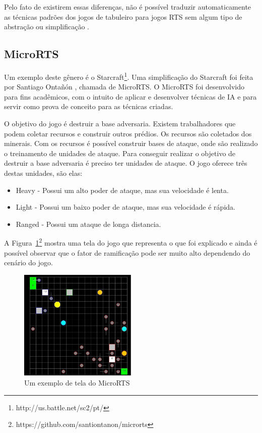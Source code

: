 Pelo fato de existirem essas diferenças, não é possível traduzir automaticamente as técnicas padrões dos jogos de tabuleiro para jogos RTS sem algum tipo de abstração ou simplificação \cite{ontanon2013survey}.
 
\subsection{MicroRTS}  
 
Um exemplo deste gênero é o Starcraft\footnote{http://us.battle.net/sc2/pt/}. Uma simplificação do Starcraft foi feita por Santiago Ontañón \cite{ontanon2013combinatorial}, chamada de MicroRTS. O MicroRTS foi desenvolvido para fins acadêmicos, com o intuito de aplicar e desenvolver técnicas de IA e para servir como prova de conceito para as técnicas criadas.

O objetivo do jogo é destruir a base adversaria. Existem trabalhadores que podem coletar recursos e construir outros prédios. Os recursos são coletados dos minerais. Com os recursos é possível construir bases de ataque, onde são realizado o treinamento de unidades de ataque. Para conseguir realizar o objetivo de destruir a base adversaria é preciso ter unidades de ataque. O jogo oferece três destas unidades, são elas:
 
 \begin{itemize}
 	\item Heavy - Possui um alto poder de ataque, mas sua velocidade é lenta.
 	\item Light - Possui um baixo poder de ataque, mas sua velocidade é rápida.
 	\item Ranged - Possui um ataque de longa distancia. 
 \end{itemize} 
 
 A Figura~\ref{fig:microrts}\footnote{https://github.com/santiontanon/microrts} mostra uma tela do jogo que representa o que foi explicado e ainda é possível observar que o fator de ramificação pode ser muito alto dependendo do cenário do jogo.
 
 \begin{figure}[ht]
 	\centering
 	\includegraphics[width=0.5\textwidth]{fig/microrts.pdf}
 	\caption{Um exemplo de tela do MicroRTS}
 	\label{fig:microrts}
 \end{figure} 
 
